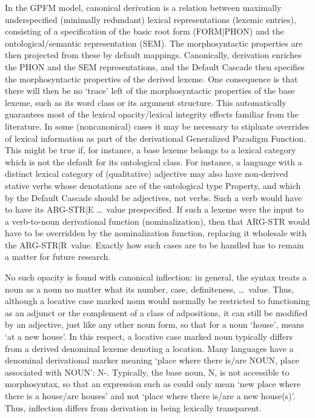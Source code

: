 \documentclass[output=paper,
modfonts
]{LSP/langsci}
\begin{document}
In the GPFM model, canonical derivation is a relation between maximally underspecified (minimally redundant) lexical representations (lexemic entries), consisting of a specification of the basic root form (FORM|PHON) and the ontological/semantic representation (SEM). The morphosyntactic properties are then projected from these by default mappings. Canonically, derivation enriches the PHON and the SEM representations, and the Default Cascade then specifies the morphosyntactic properties of the derived lexeme. One consequence is that there will then be no ‘trace’ left of the morphosyntactic properties of the base lexeme, such as its word class or its argument structure. This automatically guarantees most of the lexical opacity/lexical integrity effects familiar from the literature. In some (noncanonical) cases it may be necessary to stipluate overrides of lexical information as part of the derivational Generalized Paradigm Function. This might be true if, for instance, a base lexeme belongs to a lexical category which is not the default for its ontological class. For instance, a language with a distinct lexical category of (qualitative) adjective may also have non-derived stative verbs whose denotations are of the ontological type Property, and which by the Default Cascade should be adjectives, not verbs. Such a verb would have to have its ARG-STR|\lab E \ldots \rab\ value prespecified.  If such a lexeme were the input to a verb-to-noun derivational function (nominalization), then that ARG-STR would have to be overridden by the nominalization function, replacing it wholesale with the ARG-STR|\lab R\rab\ value. Exactly how such cases are to be handled has to remain a matter for future research.


No such opacity is found with canonical inflection: in general, the syntax treats a noun as a noun no matter what its number, case, definiteness, \ldots\ value. Thus, although a locative case marked noun would normally be restricted to functioning as an adjunct or the complement of a class of adpositions, it can still be modified by an adjective, just like any other noun form, so that for a noun ‘house’,  means ‘at a new house’. In this respect, a locative case marked noun typically differs from a  derived denominal lexeme denoting a location. Many languages have a denominal derivational marker meaning ‘place where there is/are NOUN, place associated with NOUN’: N-. Typically, the base noun, N, is not accessible to morphosyntax, so that  an expression such as  could only mean ‘new place where there is a house/are houses’ and not ‘place where there is/are a new house(s)’.  Thus, inflection differs from derivation in being lexically transparent. 
\end{document}
